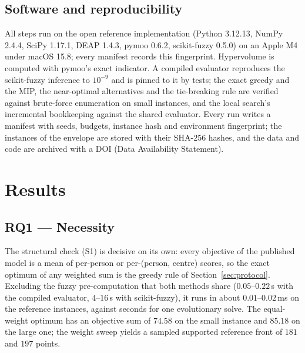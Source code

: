 \documentclass[systems,article,submit,moreauthors,pdftex]{Definitions/mdpi}
\begin{document}
\subsection{Software and reproducibility}
All steps run on the open reference implementation (Python 3.12.13, NumPy 2.4.4, SciPy
1.17.1, DEAP 1.4.3, pymoo 0.6.2, scikit-fuzzy 0.5.0) on an Apple M4 under macOS 15.8; every
manifest records this fingerprint. Hypervolume is computed with pymoo's exact indicator. A
compiled evaluator reproduces the
scikit-fuzzy inference to $10^{-9}$ and is pinned to it by tests; the exact greedy and the
MIP, the near-optimal alternatives and the tie-breaking rule are verified against brute-force
enumeration on small instances, and the local search's incremental bookkeeping against the
shared evaluator. Every run writes a manifest with seeds,
budgets, instance hash and environment fingerprint; the instances of the envelope are stored
with their SHA-256 hashes, and the data and code are archived with a DOI (Data Availability
Statement).

\section{Results}\label{sec:results}

\subsection{RQ1 --- Necessity}\label{sec:rq1}
The structural check (S1) is decisive on its own: every objective of the published model
is a mean of per-person or per-(person, centre) scores, so the exact optimum of any
weighted sum is the greedy rule of Section~\ref{sec:protocol}. Excluding the fuzzy
pre-computation that both methods share ($0.05$--$0.22$\,s with the compiled evaluator,
$4$--$16$\,s with scikit-fuzzy), it runs in
about $0.01$--$0.02$\,ms on the reference instances, against seconds for one evolutionary
solve.
The equal-weight optimum has an objective sum of $74.58$ on the small instance and $85.18$
on the large one; the weight sweep yields a sampled supported reference front of $181$ and
$197$ points.
\end{document}
